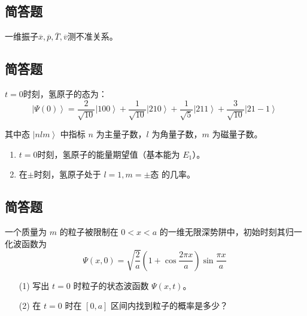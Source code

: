 \subsection{简答题}
一维振子$\overline{x},\overline{p},\overline{T},\overline{v}$测不准关系。
\subsection{简答题}
$t=0$时刻，氢原子的态为：
\[
\left| \Psi(0) \right\rangle = \frac{2}{\sqrt{10}} \left| 100 \right\rangle + \frac{1}{\sqrt{10}} \left| 210 \right\rangle + \frac{1}{\sqrt{5}} \left| 211 \right\rangle + \frac{3}{\sqrt{10}} \left| 21-1 \right\rangle~
\]

其中态 $\left| nlm\right\rangle$ 中指标 $n$ 为主量子数，$l$ 为角量子数，$m$ 为磁量子数。

\begin{enumerate}
    \item $t=0$时刻，氢原子的能量期望值（基本能为 $E_1$）。
    \item 在$\pm$时刻，氢原子处于 $l=1, m=\pm$态 的几率。
\end{enumerate}
\subsection{简答题}
一个质量为 $m$ 的粒子被限制在 $0 < x < a$ 的一维无限深势阱中，初始时刻其归一化波函数为 
\[
\Psi(x,0) = \sqrt{\frac{2}{a}} \left( 1 + \cos \frac{2\pi x}{a} \right) \sin \frac{\pi x}{a}~
\]

\begin{enumerate}
    \item [(1)] 写出 $t = 0$ 时粒子的状态波函数 $\Psi(x,t)$。
    \item [(2)] 在 $t = 0$ 时在 $[0, a]$ 区间内找到粒子的概率是多少？
\end{enumerate}